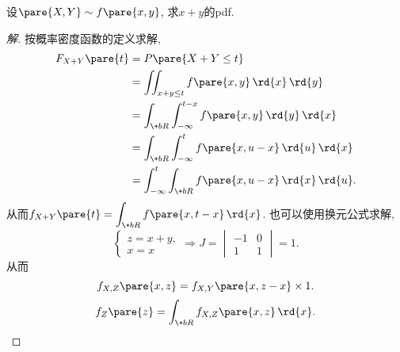\documentclass[../Statistics.tex]{subfiles}
\begin{document}
\begin{sample}
    \begin{ex}
        设$\pare{X,Y}\sim f\pare{x,y}$, 求$x+y$的pdf.
    \end{ex}
    \begin{proof}[解]
        按概率密度函数的定义求解,
        \begin{align*}
            F_{X+Y}\pare{t} &= P\pare{X+Y\le t} \\
            &= \iint_{x+y\le t} f\pare{x,y}\,\rd{x}\,\rd{y} \\
            &= \int_{\+bR} \int_{-\infty}^{t-x} f\pare{x,y}\,\rd{y}\,\rd{x} \\
            &= \int_{\+bR} \int_{-\infty}^t f\pare{x,u-x}\,\rd{u}\,\rd{x} \\
            &= \int_{-\infty}^t \int_{\+bR} f\pare{x,u-x}\,\rd{x}\,\rd{u}.
        \end{align*}
        从而$f_{X+Y}\pare{t} = \displaystyle \int_{\+bR} f\pare{x,t-x}\,\rd{x}$. 也可以使用换元公式求解,
        \[ \begin{cases}
            z = x+y,\\
            x=x
        \end{cases}\Rightarrow J = \begin{vmatrix}
            -1 & 0 \\
            1 & 1
        \end{vmatrix} = 1. \]
        从而
        \[ f_{X,Z}\pare{x,z} = f_{X,Y}\pare{x,z-x} \times 1. \]
        \[ f_Z\pare{z} = \int_{\+bR} f_{X,Z}\pare{x,z}\,\rd{x}. \qedhere \]
    \end{proof}
\end{sample}
\end{document}
